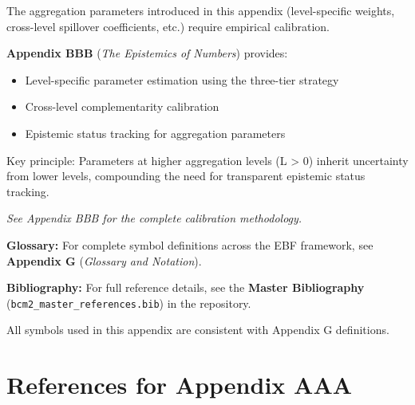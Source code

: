 The aggregation parameters introduced in this appendix (level-specific weights, 
cross-level spillover coefficients, etc.) require empirical calibration.

\textbf{Appendix BBB} (\textit{The Epistemics of Numbers}) provides:
\begin{itemize}[nosep]
    \item Level-specific parameter estimation using the three-tier strategy
    \item Cross-level complementarity calibration
    \item Epistemic status tracking for aggregation parameters
\end{itemize}

Key principle: Parameters at higher aggregation levels (L > 0) inherit 
uncertainty from lower levels, compounding the need for transparent 
epistemic status tracking.

\noindent\textit{See Appendix BBB for the complete calibration methodology.}




\begin{tcolorbox}[colback=blue!5!white, colframe=blue!75!black, 
    title=\textbf{Central References}]

\textbf{Glossary:} For complete symbol definitions across the EBF framework, 
see \textbf{Appendix G} (\textit{Glossary and Notation}).

\textbf{Bibliography:} For full reference details, see the 
\textbf{Master Bibliography} (\texttt{bcm2\_master\_references.bib}) 
in the repository.

All symbols used in this appendix are consistent with Appendix G definitions.

\end{tcolorbox}

\section{References for Appendix AAA}
\label{sec:aaa-references}

%
%

